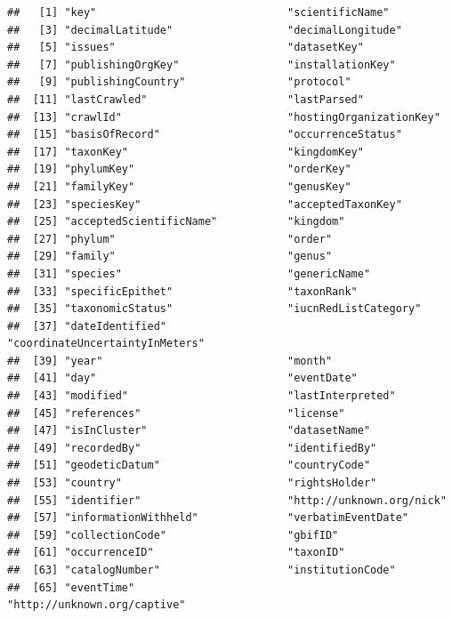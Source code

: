 \documentclass[
]{book}
\begin{document}
\begin{verbatim}
##   [1] "key"                              "scientificName"                  
##   [3] "decimalLatitude"                  "decimalLongitude"                
##   [5] "issues"                           "datasetKey"                      
##   [7] "publishingOrgKey"                 "installationKey"                 
##   [9] "publishingCountry"                "protocol"                        
##  [11] "lastCrawled"                      "lastParsed"                      
##  [13] "crawlId"                          "hostingOrganizationKey"          
##  [15] "basisOfRecord"                    "occurrenceStatus"                
##  [17] "taxonKey"                         "kingdomKey"                      
##  [19] "phylumKey"                        "orderKey"                        
##  [21] "familyKey"                        "genusKey"                        
##  [23] "speciesKey"                       "acceptedTaxonKey"                
##  [25] "acceptedScientificName"           "kingdom"                         
##  [27] "phylum"                           "order"                           
##  [29] "family"                           "genus"                           
##  [31] "species"                          "genericName"                     
##  [33] "specificEpithet"                  "taxonRank"                       
##  [35] "taxonomicStatus"                  "iucnRedListCategory"             
##  [37] "dateIdentified"                   "coordinateUncertaintyInMeters"   
##  [39] "year"                             "month"                           
##  [41] "day"                              "eventDate"                       
##  [43] "modified"                         "lastInterpreted"                 
##  [45] "references"                       "license"                         
##  [47] "isInCluster"                      "datasetName"                     
##  [49] "recordedBy"                       "identifiedBy"                    
##  [51] "geodeticDatum"                    "countryCode"                     
##  [53] "country"                          "rightsHolder"                    
##  [55] "identifier"                       "http://unknown.org/nick"         
##  [57] "informationWithheld"              "verbatimEventDate"               
##  [59] "collectionCode"                   "gbifID"                          
##  [61] "occurrenceID"                     "taxonID"                         
##  [63] "catalogNumber"                    "institutionCode"                 
##  [65] "eventTime"                        "http://unknown.org/captive"      

\end{verbatim}
\end{document}
